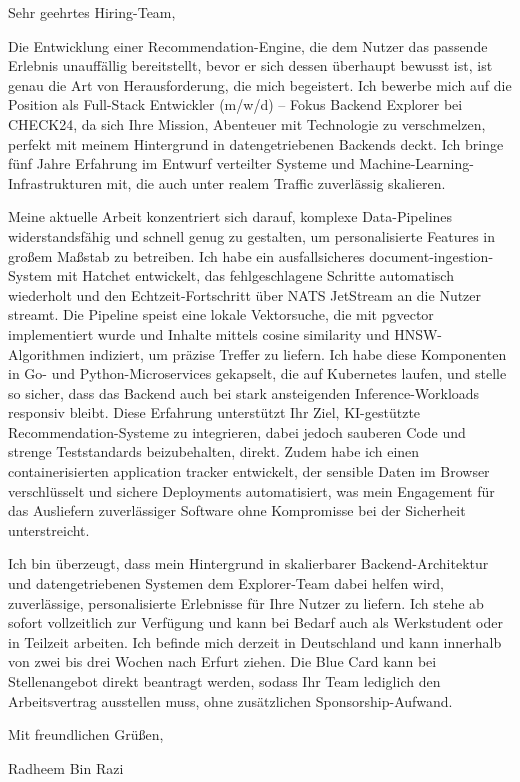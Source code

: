 \documentclass[11pt,a4paper]{coverletter}
\begin{document}
\opening{Sehr geehrtes Hiring-Team,}

Die Entwicklung einer Recommendation-Engine, die dem Nutzer das passende Erlebnis unauffällig bereitstellt, bevor er sich dessen überhaupt bewusst ist, ist genau die Art von Herausforderung, die mich begeistert. Ich bewerbe mich auf die Position als Full-Stack Entwickler (m/w/d) – Fokus Backend Explorer bei CHECK24, da sich Ihre Mission, Abenteuer mit Technologie zu verschmelzen, perfekt mit meinem Hintergrund in datengetriebenen Backends deckt. Ich bringe fünf Jahre Erfahrung im Entwurf verteilter Systeme und Machine-Learning-Infrastrukturen mit, die auch unter realem Traffic zuverlässig skalieren.

Meine aktuelle Arbeit konzentriert sich darauf, komplexe Data-Pipelines widerstandsfähig und schnell genug zu gestalten, um personalisierte Features in großem Maßstab zu betreiben. Ich habe ein ausfallsicheres document-ingestion-System mit Hatchet entwickelt, das fehlgeschlagene Schritte automatisch wiederholt und den Echtzeit-Fortschritt über NATS JetStream an die Nutzer streamt. Die Pipeline speist eine lokale Vektorsuche, die mit pgvector implementiert wurde und Inhalte mittels cosine similarity und HNSW-Algorithmen indiziert, um präzise Treffer zu liefern. Ich habe diese Komponenten in Go- und Python-Microservices gekapselt, die auf Kubernetes laufen, und stelle so sicher, dass das Backend auch bei stark ansteigenden Inference-Workloads responsiv bleibt. Diese Erfahrung unterstützt Ihr Ziel, KI-gestützte Recommendation-Systeme zu integrieren, dabei jedoch sauberen Code und strenge Teststandards beizubehalten, direkt. Zudem habe ich einen containerisierten application tracker entwickelt, der sensible Daten im Browser verschlüsselt und sichere Deployments automatisiert, was mein Engagement für das Ausliefern zuverlässiger Software ohne Kompromisse bei der Sicherheit unterstreicht.

Ich bin überzeugt, dass mein Hintergrund in skalierbarer Backend-Architektur und datengetriebenen Systemen dem Explorer-Team dabei helfen wird, zuverlässige, personalisierte Erlebnisse für Ihre Nutzer zu liefern. Ich stehe ab sofort vollzeitlich zur Verfügung und kann bei Bedarf auch als Werkstudent oder in Teilzeit arbeiten. Ich befinde mich derzeit in Deutschland und kann innerhalb von zwei bis drei Wochen nach Erfurt ziehen. Die Blue Card kann bei Stellenangebot direkt beantragt werden, sodass Ihr Team lediglich den Arbeitsvertrag ausstellen muss, ohne zusätzlichen Sponsorship-Aufwand.

\closing{Mit freundlichen Grüßen,}{Radheem Bin Razi}
\end{document}
